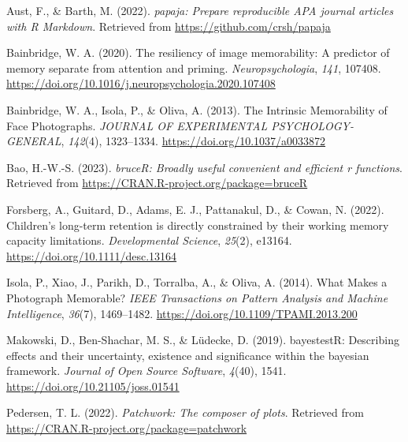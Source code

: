 \documentclass[
  man]{apa6}
\newlength{\cslhangindent}
\newlength{\cslentryspacingunit} %
\newenvironment{CSLReferences}[2] %
 {%
  \setlength{\parindent}{0pt}
  \ifodd #1
  \let\oldpar\par
  \def\par{\hangindent=\cslhangindent\oldpar}
  \fi
  \setlength{\parskip}{#2\cslentryspacingunit}
 }%
 {}
\begin{document}
\hypertarget{refs}{}
\begin{CSLReferences}{1}{0}
\leavevmode{}%
Aust, F., \& Barth, M. (2022). \emph{{papaja}: {Prepare} reproducible {APA} journal articles with {R Markdown}}. Retrieved from \url{https://github.com/crsh/papaja}

\leavevmode{}%
Bainbridge, W. A. (2020). The resiliency of image memorability: {A} predictor of memory separate from attention and priming. \emph{Neuropsychologia}, \emph{141}, 107408. \url{https://doi.org/10.1016/j.neuropsychologia.2020.107408}

\leavevmode{}%
Bainbridge, W. A., Isola, P., \& Oliva, A. (2013). The {Intrinsic} {Memorability} of {Face} {Photographs}. \emph{JOURNAL OF EXPERIMENTAL PSYCHOLOGY-GENERAL}, \emph{142}(4), 1323--1334. \url{https://doi.org/10.1037/a0033872}

\leavevmode{}%
Bao, H.-W.-S. (2023). \emph{bruceR: Broadly useful convenient and efficient r functions}. Retrieved from \url{https://CRAN.R-project.org/package=bruceR}

\leavevmode{}%
Forsberg, A., Guitard, D., Adams, E. J., Pattanakul, D., \& Cowan, N. (2022). Children's long-term retention is directly constrained by their working memory capacity limitations. \emph{Developmental Science}, \emph{25}(2), e13164. \url{https://doi.org/10.1111/desc.13164}

\leavevmode{}%
Isola, P., Xiao, J., Parikh, D., Torralba, A., \& Oliva, A. (2014). What {Makes} a {Photograph} {Memorable}? \emph{IEEE Transactions on Pattern Analysis and Machine Intelligence}, \emph{36}(7), 1469--1482. \url{https://doi.org/10.1109/TPAMI.2013.200}

\leavevmode{}%
Makowski, D., Ben-Shachar, M. S., \& Lüdecke, D. (2019). bayestestR: Describing effects and their uncertainty, existence and significance within the bayesian framework. \emph{Journal of Open Source Software}, \emph{4}(40), 1541. \url{https://doi.org/10.21105/joss.01541}

\leavevmode{}%
Pedersen, T. L. (2022). \emph{Patchwork: The composer of plots}. Retrieved from \url{https://CRAN.R-project.org/package=patchwork}


\end{CSLReferences}
\end{document}
